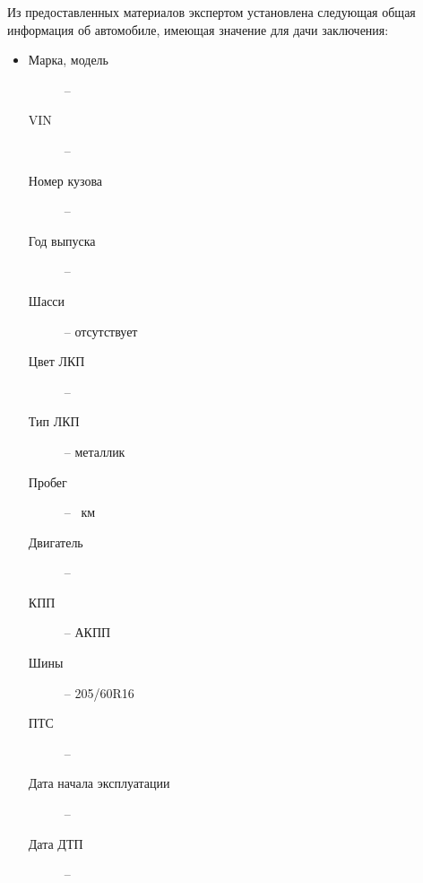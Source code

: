  \par Из предоставленных материалов   экспертом установлена следующая общая информация об автомобиле, имеющая значение для дачи заключения:\\
 \parbox[]{10cm}{}
	\begin{itemize}
		\item[ ] 
			\begin{description}
			\item[Марка, модель] -- 
			\item[VIN] -- \vin
			\item[Номер кузова] -- \vinbody
			\item[Год выпуска] -- 
			\item[Шасси] -- отсутствует
			\item[Цвет ЛКП] -- 
			\item[Тип ЛКП] -- металлик
			\item[Пробег] --  \, км%
			\item[Двигатель] -- 
			\item[КПП] -- АКПП
			\item[Шины] -- 205/60R16
	    	\item[ПТС] --	
	    	\item[Дата начала эксплуатации] --
	    	\item[Дата ДТП]-- \datadtp
		\end{description}
		\end{itemize}
	

